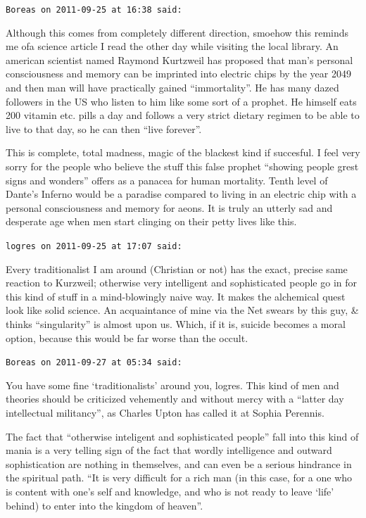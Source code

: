 \begin{footnotesize}
\begin{sffamily}
\texttt{Boreas on 2011-09-25 at 16:38 said:}

Although this comes from completely different direction, smoehow this reminds me ofa science article I read the other day while visiting the local library. An american scientist named Raymond Kurtzweil has proposed that man's personal consciousness and memory can be imprinted into electric chips by the year 2049 and then man will have practically gained ``immortality''. He has many dazed followers in the US who listen to him like some sort of a prophet. He himself eats 200 vitamin etc. pills a day and follows a very strict dietary regimen to be able to live to that day, so he can then ``live forever''.

This is complete, total madness, magic of the blackest kind if succesful. I feel very sorry for the people who believe the stuff this false prophet ``showing people grest signs and wonders'' offers as a panacea for human mortality. Tenth level of Dante's Inferno would be a paradise compared to living in an electric chip with a personal consciousness and memory for aeons. It is truly an utterly sad and desperate age when men start clinging on their petty lives like this.

\hfill

\texttt{logres on 2011-09-25 at 17:07 said:}

Every traditionalist I am around (Christian or not) has the exact, precise same reaction to Kurzweil; otherwise very intelligent and sophisticated people go in for this kind of stuff in a mind-blowingly naive way. It makes the alchemical quest look like solid science. An acquaintance of mine via the Net swears by this guy, \& thinks ``singularity'' is almost upon us. Which, if it is, suicide becomes a moral option, because this would be far worse than the occult.

\hfill

\texttt{Boreas on 2011-09-27 at 05:34 said:}

You have some fine `traditionalists' around you, logres. This kind of men and theories should be criticized vehemently and without mercy with a ``latter day intellectual militancy'', as Charles Upton has called it at Sophia Perennis.

The fact that ``otherwise inteligent and sophisticated people'' fall into this kind of mania is a very telling sign of the fact that wordly intelligence and outward sophistication are nothing in themselves, and can even be a serious hindrance in the spiritual path. ``It is very difficult for a rich man (in this case, for a one who is content with one's self and knowledge, and who is not ready to leave `life' behind) to enter into the kingdom of heaven''.


\hfill

\end{sffamily}
\end{footnotesize}

